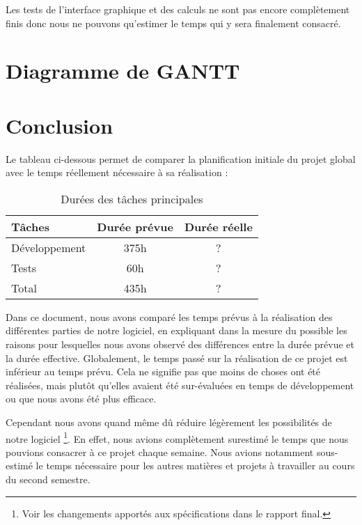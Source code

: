 \documentclass[a4paper]{report}
\begin{document}
Les tests de l'interface graphique et des calculs ne sont pas encore complètement finis donc nous ne pouvons qu'estimer le temps qui y sera finalement consacré.


\chapter{Diagramme de GANTT}


\chapter{Conclusion}

Le tableau ci-dessous permet de comparer la planification initiale du projet global avec le temps réellement nécessaire à sa réalisation :

\begin{table}[H]
\centering
  \begin{tabularx}{0.8\textwidth}{| X | c | c |}
    \hline
	Tâches & Durée prévue & Durée réelle \\
    \hline
    Développement & 375h & ?\\
    Tests & 60h & ?\\
    \hline
	Total & 435h & ?\\
    \hline
  \end{tabularx}
  \caption{Durées des tâches principales}
\end{table}

Dans ce document, nous avons comparé les temps prévus à la réalisation des différentes parties de notre logiciel, en expliquant dans la mesure du possible les raisons pour lesquelles nous avons observé des différences entre la durée prévue et la durée effective.
Globalement, le temps passé sur la réalisation de ce projet est inférieur au temps prévu.
Cela ne signifie pas que moins de choses ont été réalisées, mais plutôt qu'elles avaient été sur-évaluées en temps de développement ou que nous avons été plus efficace.

Cependant nous avons quand même dû réduire légèrement les possibilités de notre logiciel \footnote{Voir les changements apportés aux spécifications dans le rapport final.}.
En effet, nous avions complètement surestimé le temps que nous pouvions consacrer à ce projet chaque semaine.
Nous avions notamment sous-estimé le temps nécessaire pour les autres matières et projets à travailler au cours du second semestre.
\end{document}

